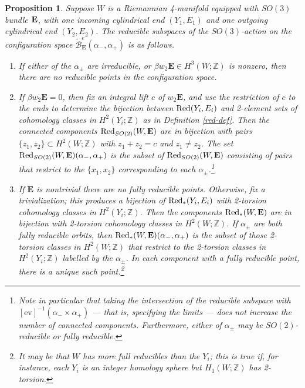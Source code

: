 \documentclass[10pt,a4paper]{amsart}
\newtheorem{proposition}[theorem]{Proposition}
\theoremstyle{definition}
\theoremstyle{remark}
\numberwithin{figure}{qchap}
\begin{document}
\begin{proposition}\label{action3}Suppose $W$ is a Riemannian 4-manifold equipped with $SO(3)$ bundle $\bf E$, with one incoming cylindrical end $(Y_1, E_1)$ and one outgoing cylindrical end $(Y_2,E_2)$. The reducible subspaces of the $SO(3)$-action on the configuration space $\widetilde{\mathcal B}^{e}_{\mathbf{E}}(\alpha_-, \alpha_+)$ is as follows.\begin{enumerate}
    \item If either of the $\alpha_\pm$ are irreducible, or $\beta w_2 \mathbf{E} \in H^3(W;\mathbb Z)$ is nonzero, then there are no reducible points in the configuration space.

    \item If $\beta w_2 \mathbf{E} = 0$, then fix an integral lift $c$ of $w_2 \mathbf{E}$, and use the restriction of $c$ to the ends to determine the bijection between $\textup{Red}(Y_i, E_i)$ and 2-element sets of cohomology classes in $H^2(Y_i; \mathbb Z)$ as in Definition \ref{red-def}. Then the connected components $\textup{Red}_{SO(2)}(W,\mathbf{E})$ are in bijection with pairs $\{z_1, z_2\} \subset H^2(W;\mathbb Z)$ with $z_1 + z_2 = c$ and $z_1 \neq z_2$. The set $\textup{Red}_{SO(2)}(W,\mathbf{E})(\alpha_-, \alpha_+)$ is the subset of $\textup{Red}_{SO(2)}(W,\mathbf{E})$ consisting of pairs that restrict to the $\{x_1, x_2\}$ corresponding to each $\alpha_\pm$.\footnote{Note in particular that taking the intersection of the reducible subspace with $[\text{ev}]^{-1}(\alpha_- \times \alpha_+)$ --- that is, specifying the limits --- does not increase the number of connected components. Furthermore, either of $\alpha_\pm$ may be $SO(2)$-reducible or fully reducible.}

    \item If $\mathbf{E}$ is nontrivial there are no fully reducible points. Otherwise, fix a trivialization; this produces a bijection of $\textup{Red}_{*}(Y_i, E_i)$ with 2-torsion cohomology classes in $H^2(Y_i;\mathbb Z)$. Then the components $\textup{Red}_*(W,\mathbf{E})$ are in bijection with 2-torsion cohomology classes in $H^2(W;\mathbb Z)$. If $\alpha_\pm$ are both fully reducible orbits, then $\textup{Red}_*(W,\mathbf{E})(\alpha_-, \alpha_+)$ is the subset of those 2-torsion classes in $H^2(W;\mathbb Z)$ that restrict to the 2-torsion classes in $H^2(Y_i;\mathbb Z)$ labelled by the $\alpha_\pm$. In each component with a fully reducible point, there is a unique such point.\footnote{It may be that $W$ has more full reducibles than the $Y_i$; this is true if, for instance, each $Y_i$ is an integer homology sphere but $H_1(W;\mathbb Z)$ has 2-torsion.}
\end{enumerate}
\end{proposition}
\end{document}

